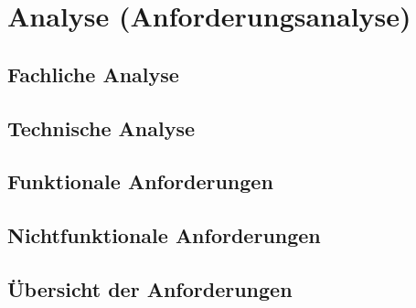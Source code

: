 \chapter{Analyse (Anforderungsanalyse)}

\section{Fachliche Analyse}

\section{Technische Analyse}

\section{Funktionale Anforderungen}

\section{Nichtfunktionale Anforderungen}

\section{Übersicht der Anforderungen}
